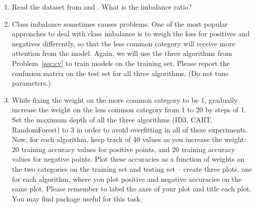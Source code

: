 \documentclass[11pt]{article}
\begin{document}
\begin{enumerate}[label=(\alph*)]

\item Read the dataset from  and . What is the imbalance ratio?

\item Class imbalance sometimes causes problems. One of the most popular approaches to deal with class imbalance is to weigh the loss for positives and negatives differently, so that the less common category will receive more attention from the model. Again, we will use the three algorithms from Problem~\ref{sec:cv} to train models on the training set. Please report the confusion matrix on the test set for all three algorithms. (Do not tune parameters.)

\item While fixing the weight on the more common category to be 1, gradually increase the weight on the less common category from 1 to 20 by steps of 1. Set the maximum depth of all the three algorithms (ID3, CART, RandomForest) to 3 in order to avoid overfitting in all of these experiments. Now, for each algorithm, keep track of 40 values as you increase the weight: 20 training accuracy values for positive points, and 20 training accuracy values for negative points. Plot these accuracies as a function of weights on the two categories on the training set and testing set -- create three plots, one for each algorithm, where you plot positive and negative accuracies on the same plot. Please remember to label the axes of your plot and title each plot. You may find  package useful for this task.


\end{enumerate}
\end{document}
